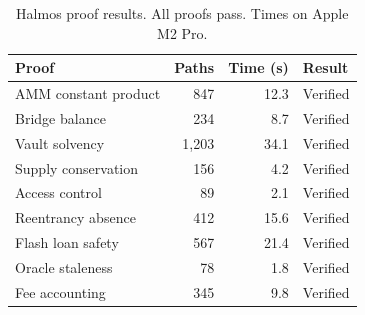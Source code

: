 \begin{table}[H]
\centering
\small
\begin{tabular}{@{}lrrl@{}}
\toprule
\textbf{Proof} & \textbf{Paths} & \textbf{Time (s)} & \textbf{Result} \\
\midrule
AMM constant product & 847 & 12.3 & Verified \\
Bridge balance & 234 & 8.7 & Verified \\
Vault solvency & 1,203 & 34.1 & Verified \\
Supply conservation & 156 & 4.2 & Verified \\
Access control & 89 & 2.1 & Verified \\
Reentrancy absence & 412 & 15.6 & Verified \\
Flash loan safety & 567 & 21.4 & Verified \\
Oracle staleness & 78 & 1.8 & Verified \\
Fee accounting & 345 & 9.8 & Verified \\
\bottomrule
\end{tabular}
\caption{Halmos proof results. All proofs pass. Times on Apple M2 Pro.}
\end{table}

